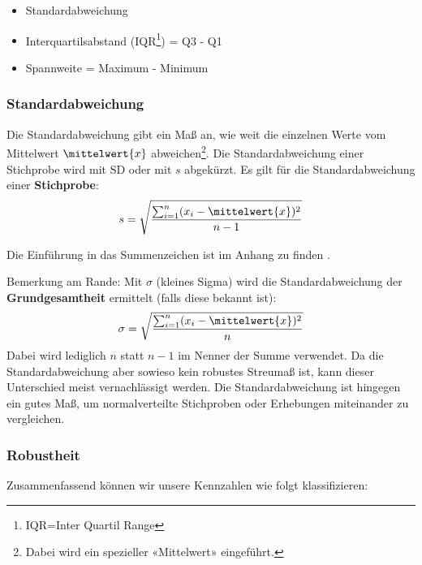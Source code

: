 \begin{itemize}
\item Standardabweichung

\item Interquartilsabstand (IQR\footnote{IQR=Inter Quartil
    Range}) = Q3 - Q1

\item Spannweite = Maximum - Minimum

\end{itemize}

\subsubsection{Standardabweichung}
Die Standardabweichung gibt ein Maß an, wie weit die einzelnen Werte
vom Mittelwert $\mittelwert{x}$ abweichen\footnote{Dabei wird ein spezieller «Mittelwert»
  eingeführt.}.
Die Standardabweichung einer Stichprobe wird mit $\textrm{SD}$ oder
mit $s$ abgekürzt. Es gilt für die Standardabweichung einer
\textbf{Stichprobe}:
$$s = \sqrt{\frac{\sum_{i=1}^n(x_i-\mittelwert{x})^2}{n-1}}$$

Die Einführung in das Summenzeichen ist im Anhang zu finden .

Bemerkung am Rande: Mit $\sigma$ (kleines Sigma) wird die
Standardabweichung der \textbf{Grundgesamtheit} ermittelt (falls diese
bekannt ist):
$$\sigma = \sqrt{\frac{\sum_{i=1}^n(x_i-\mittelwert{x})^2}{n}}$$
Dabei wird lediglich $n$ statt $n-1$ im Nenner der Summe verwendet. Da
die Standardabweichung aber sowieso kein robustes Streumaß ist, kann
dieser Unterschied meist vernachlässigt werden. Die Standardabweichung ist hingegen ein gutes Maß, um normalverteilte Stichproben oder Erhebungen miteinander zu vergleichen. 

\newpage
\subsubsection{Robustheit}
Zusammenfassend können wir unsere Kennzahlen wie folgt klassifizieren:


